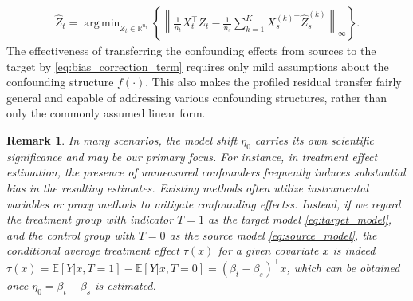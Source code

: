 \documentclass[12pt]{article}
\newtheorem{remark}{Remark}
\DeclareMathOperator*{\argmin}{arg\,min}
\begin{document}
\begin{align}
\label{eq:bias_correction_term}
    \hat{Z}_t = \argmin_{Z_t \in \mathbb{R}^{n_t}}\left\{\left\|\frac{1}{n_t}X_t^\top Z_t - \frac{1}{n_s}\sum_{k=1}^K X_s^{(k)\top}\hat{Z}_s^{(k)}\right\|_{\infty}\right\}.
\end{align}
The effectiveness of transferring the confounding effects from sources to the target by \eqref{eq:bias_correction_term} requires only mild assumptions about the confounding structure $f(\cdot)$. This also makes the profiled residual transfer fairly general and capable of addressing various confounding structures, rather than only the commonly assumed linear form. 


\begin{remark}\label{emp:cate}
In many scenarios, the model shift $\eta_0$ carries its own scientific significance and may be our primary focus. For instance, in treatment effect estimation, the presence of unmeasured confounders frequently induces substantial bias in the resulting estimates. Existing methods often utilize instrumental variables or proxy methods to mitigate confounding effectss. Instead, if we regard the treatment group with indicator $T=1$ as the target model \eqref{eq:target_model}, and the control group with $T=0$ as the source model \eqref{eq:source_model}, the conditional average treatment effect $\tau(x)$ for a given covariate $x$ is indeed 
$\tau(x) = \mathbb{E}[Y|x,T = 1] - \mathbb{E}[Y|x,T = 0] = (\beta_t -\beta_s)^\top x$, which can be obtained once $\eta_0 = \beta_t - \beta_s$ is estimated.
\end{remark}
\end{document}
